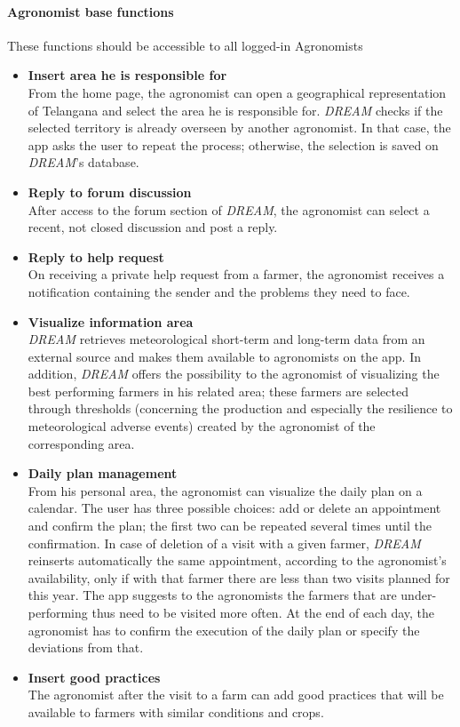 \paragraph{Agronomist base functions}
These functions should be accessible to all logged-in Agronomists
\begin{itemize}
    \item\textbf{Insert area he is responsible for}\\
    From the home page, the agronomist can open a geographical representation of Telangana
    and select the area he is responsible for. \emph{DREAM} checks if the selected territory is already overseen
    by another agronomist. In that case, the app asks the user to repeat the process;
    otherwise, the selection is saved on \emph{DREAM}'s database.
    \item \textbf{Reply to forum discussion}\\
    After access to the forum section of \emph{DREAM}, the agronomist can select a recent,
    not closed discussion and post a reply.
    \item \textbf{Reply to help request}\\
    On receiving a private help request from a farmer, the agronomist receives a
    notification containing the sender and the problems they need to face.
    \item \textbf{Visualize information area}\\
    \emph{DREAM} retrieves meteorological short-term and long-term data from an external source
    and makes them available to agronomists on the app.
    \newline In addition, \emph{DREAM} offers the possibility to the agronomist of visualizing the best
    performing farmers in his related area; these farmers are selected through thresholds
    (concerning the production and especially the resilience to meteorological adverse events)
    created by the agronomist of the corresponding area.
    \item\textbf{Daily plan management}\\
    From his personal area, the agronomist can visualize the daily plan on a calendar.
    The user has three possible choices: add or delete an appointment and confirm the plan;
    the first two can be repeated several times until the confirmation. In case of deletion of a visit with a given farmer,
    \emph{DREAM} reinserts automatically the same appointment, according to the agronomist's availability,
    only if with that farmer there are less than two visits planned for this year.
    \newline The app suggests to the agronomists the farmers that are under-performing thus need to be visited more often.
    \newline At the end of each day, the agronomist has to confirm the execution of the daily plan or specify
    the deviations from that.
    \item\textbf{Insert good practices}\\
    The agronomist after the visit to a farm can add good practices
    that will be available to farmers with similar conditions and crops.
\end{itemize}

